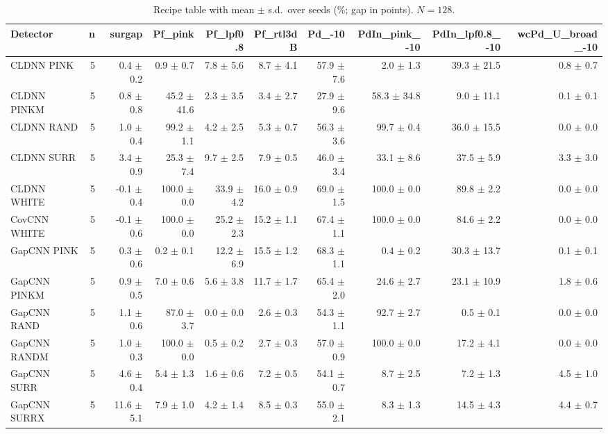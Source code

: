 \begin{table}[t]
\centering
\caption{Recipe table with mean $\pm$ s.d.\ over seeds (\%; gap in points). $N=128$.}
\label{tab:supp-recipes}
\scriptsize
\setlength{\tabcolsep}{2pt}
\begin{tabular}{lrrrrrrrrr}
\toprule
Detector & n & surgap & Pf\_pink & Pf\_lpf0.8 & Pf\_rtl3dB & Pd\_-10 & PdIn\_pink\_-10 & PdIn\_lpf0.8\_-10 & wcPd\_U\_broad\_-10 \\
\midrule
CLDNN PINK & 5 & 0.4 $\pm$ 0.2 & 0.9 $\pm$ 0.7 & 7.8 $\pm$ 5.6 & 8.7 $\pm$ 4.1 & 57.9 $\pm$ 7.6 & 2.0 $\pm$ 1.3 & 39.3 $\pm$ 21.5 & 0.8 $\pm$ 0.7 \\
CLDNN PINKM & 5 & 0.8 $\pm$ 0.8 & 45.2 $\pm$ 41.6 & 2.3 $\pm$ 3.5 & 3.4 $\pm$ 2.7 & 27.9 $\pm$ 9.6 & 58.3 $\pm$ 34.8 & 9.0 $\pm$ 11.1 & 0.1 $\pm$ 0.1 \\
CLDNN RAND & 5 & 1.0 $\pm$ 0.4 & 99.2 $\pm$ 1.1 & 4.2 $\pm$ 2.5 & 5.3 $\pm$ 0.7 & 56.3 $\pm$ 3.6 & 99.7 $\pm$ 0.4 & 36.0 $\pm$ 15.5 & 0.0 $\pm$ 0.0 \\
CLDNN SURR & 5 & 3.4 $\pm$ 0.9 & 25.3 $\pm$ 7.4 & 9.7 $\pm$ 2.5 & 7.9 $\pm$ 0.5 & 46.0 $\pm$ 3.4 & 33.1 $\pm$ 8.6 & 37.5 $\pm$ 5.9 & 3.3 $\pm$ 3.0 \\
CLDNN WHITE & 5 & -0.1 $\pm$ 0.4 & 100.0 $\pm$ 0.0 & 33.9 $\pm$ 4.2 & 16.0 $\pm$ 0.9 & 69.0 $\pm$ 1.5 & 100.0 $\pm$ 0.0 & 89.8 $\pm$ 2.2 & 0.0 $\pm$ 0.0 \\
CovCNN WHITE & 5 & -0.1 $\pm$ 0.6 & 100.0 $\pm$ 0.0 & 25.2 $\pm$ 2.3 & 15.2 $\pm$ 1.1 & 67.4 $\pm$ 1.1 & 100.0 $\pm$ 0.0 & 84.6 $\pm$ 2.2 & 0.0 $\pm$ 0.0 \\
GapCNN PINK & 5 & 0.3 $\pm$ 0.6 & 0.2 $\pm$ 0.1 & 12.2 $\pm$ 6.9 & 15.5 $\pm$ 1.2 & 68.3 $\pm$ 1.1 & 0.4 $\pm$ 0.2 & 30.3 $\pm$ 13.7 & 0.1 $\pm$ 0.1 \\
GapCNN PINKM & 5 & 0.9 $\pm$ 0.5 & 7.0 $\pm$ 0.6 & 5.6 $\pm$ 3.8 & 11.7 $\pm$ 1.7 & 65.4 $\pm$ 2.0 & 24.6 $\pm$ 2.7 & 23.1 $\pm$ 10.9 & 1.8 $\pm$ 0.6 \\
GapCNN RAND & 5 & 1.1 $\pm$ 0.6 & 87.0 $\pm$ 3.7 & 0.0 $\pm$ 0.0 & 2.6 $\pm$ 0.3 & 54.3 $\pm$ 1.1 & 92.7 $\pm$ 2.7 & 0.5 $\pm$ 0.1 & 0.0 $\pm$ 0.0 \\
GapCNN RANDM & 5 & 1.0 $\pm$ 0.3 & 100.0 $\pm$ 0.0 & 0.5 $\pm$ 0.2 & 2.7 $\pm$ 0.3 & 57.0 $\pm$ 0.9 & 100.0 $\pm$ 0.0 & 17.2 $\pm$ 4.1 & 0.0 $\pm$ 0.0 \\
GapCNN SURR & 5 & 4.6 $\pm$ 0.4 & 5.4 $\pm$ 1.3 & 1.6 $\pm$ 0.6 & 7.2 $\pm$ 0.5 & 54.1 $\pm$ 0.7 & 8.7 $\pm$ 2.5 & 7.2 $\pm$ 1.3 & 4.5 $\pm$ 1.0 \\
GapCNN SURRX & 5 & 11.6 $\pm$ 5.1 & 7.9 $\pm$ 1.0 & 4.2 $\pm$ 1.4 & 8.5 $\pm$ 0.3 & 55.0 $\pm$ 2.1 & 8.3 $\pm$ 1.3 & 14.5 $\pm$ 4.3 & 4.4 $\pm$ 0.7 \\

\end{tabular}
\end{table}

